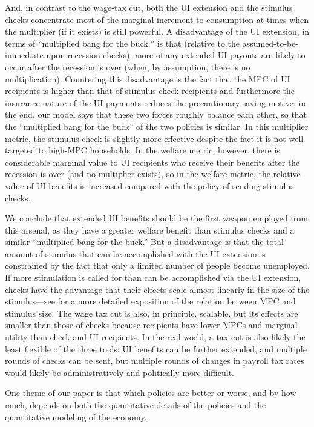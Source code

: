 \documentclass[\econtexRoot/HAFiscal]{subfiles}
\begin{document}
And, in contrast to the wage-tax cut, both the UI extension and the stimulus checks concentrate most of the marginal increment to consumption at times when the multiplier (if it exists) is still powerful.  A disadvantage of the UI extension, in terms of ``multiplied bang for the buck,'' is that (relative to the assumed-to-be-immediate-upon-recession checks), more of any extended UI payouts are likely to occur after the recession is over (when, by assumption, there is no multiplication).  Countering this disadvantage is the fact that the MPC of UI recipients is higher than that of stimulus check recipients and furthermore the insurance nature of the UI payments reduces the precautionary saving motive; in the end, our model says that these two forces roughly balance each other, so that the ``multiplied bang for the buck'' of the two policies is similar.  In this multiplier metric, the stimulus check is slightly more effective despite the fact it is not well targeted to high-MPC households.  In the welfare metric, however, there is considerable marginal value to UI recipients who receive their benefits after the recession is over (and no multiplier exists), so in the welfare metric, the relative value of UI benefits is increased compared with the policy of sending stimulus checks.

We conclude that extended UI benefits should be the first weapon employed from this arsenal, as they have a greater welfare benefit than stimulus checks and a similar ``multiplied bang for the buck.'' But a disadvantage is that the total amount of stimulus that can be accomplished with the UI extension is constrained by the fact that only a limited number of people become unemployed.  If more stimulation is called for than can be accomplished via the UI extension, checks have the advantage that their effects scale almost linearly in the size of the stimulus---see \cite{beraja2023size} for a more detailed exposition of the relation between MPC and stimulus size.  The wage tax cut is also, in principle, scalable, but its effects are smaller than those of checks because recipients have lower MPCs and marginal utility than check and UI recipients.  In the real world, a tax cut is also likely the least flexible of the three tools:  UI benefits can be further extended, and multiple rounds of checks can be sent, but multiple rounds of changes in payroll tax rates would likely be administratively and politically more difficult.

One theme of our paper is that which policies are better or worse, and by how much, depends on both the quantitative details of the policies and the quantitative modeling of the economy.  
\end{document}

